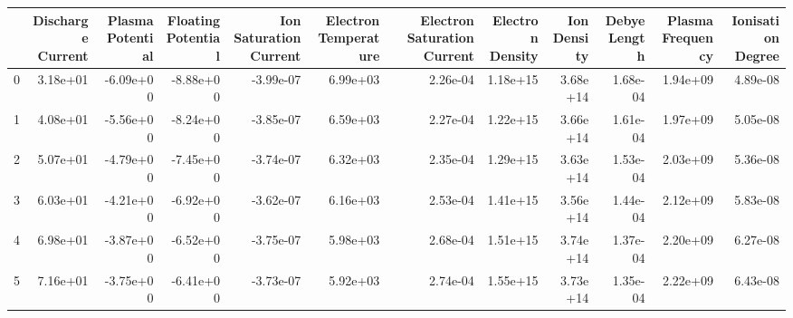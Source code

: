 \begin{tabular}{lrrrrrrrrrrr}
\toprule
{} &  Discharge Current &  Plasma Potential &  Floating Potential &  Ion Saturation Current &  Electron Temperature &  Electron Saturation Current &  Electron Density &  Ion Density &  Debye Length &  Plasma Frequency &  Ionisation Degree \\
\midrule
0 &           3.18e+01 &         -6.09e+00 &           -8.88e+00 &               -3.99e-07 &              6.99e+03 &                     2.26e-04 &          1.18e+15 &     3.68e+14 &      1.68e-04 &          1.94e+09 &           4.89e-08 \\
1 &           4.08e+01 &         -5.56e+00 &           -8.24e+00 &               -3.85e-07 &              6.59e+03 &                     2.27e-04 &          1.22e+15 &     3.66e+14 &      1.61e-04 &          1.97e+09 &           5.05e-08 \\
2 &           5.07e+01 &         -4.79e+00 &           -7.45e+00 &               -3.74e-07 &              6.32e+03 &                     2.35e-04 &          1.29e+15 &     3.63e+14 &      1.53e-04 &          2.03e+09 &           5.36e-08 \\
3 &           6.03e+01 &         -4.21e+00 &           -6.92e+00 &               -3.62e-07 &              6.16e+03 &                     2.53e-04 &          1.41e+15 &     3.56e+14 &      1.44e-04 &          2.12e+09 &           5.83e-08 \\
4 &           6.98e+01 &         -3.87e+00 &           -6.52e+00 &               -3.75e-07 &              5.98e+03 &                     2.68e-04 &          1.51e+15 &     3.74e+14 &      1.37e-04 &          2.20e+09 &           6.27e-08 \\
5 &           7.16e+01 &         -3.75e+00 &           -6.41e+00 &               -3.73e-07 &              5.92e+03 &                     2.74e-04 &          1.55e+15 &     3.73e+14 &      1.35e-04 &          2.22e+09 &           6.43e-08 \\
\bottomrule
\end{tabular}
